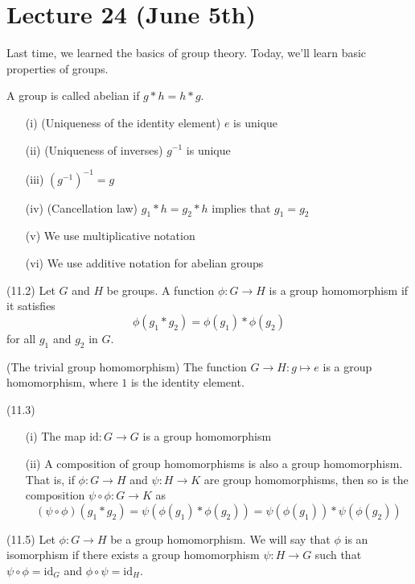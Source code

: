 \section{Lecture 24 (June 5th)}
Last time, we learned the basics of group theory. Today, we'll learn basic properties of groups.
\newline
\begin{rmk}
A group is called abelian if $g*h=h*g$. 
\begin{itemize}
\item[(i)] (Uniqueness of the identity element) $e$ is unique
\item[(ii)] (Uniqueness of inverses) $g^{-1}$ is unique
\item[(iii)] $(g^{-1})^{-1}=g$
\item[(iv)] (Cancellation law) $g_1*h=g_2*h$ implies that $g_1=g_2$
\item[(v)] We use multiplicative notation
\item[(vi)] We use additive notation for abelian groups
\end{itemize}
\end{rmk}
\vspace{2ex}
\begin{defi}
(11.2) Let $G$ and $H$ be groups. A function $\phi :G\rightarrow H$ is a group homomorphism if it satisfies
\[\phi (g_1*g_2)=\phi (g_1)*\phi (g_2)\]
for all $g_1$ and $g_2$ in $G$. 
\end{defi}
\vspace{2ex}
\begin{ex}
(The trivial group homomorphism) The function $G\rightarrow H:g\mapsto e$ is a group homomorphism, where $1$ is the identity element.
\end{ex}
\vspace{2ex}
\begin{prop}
(11.3)
\begin{itemize}
\item[(i)] The map $\mathrm{id}:G\rightarrow G$ is a group homomorphism
\item[(ii)] A composition of group homomorphisms is also a group homomorphism. That is, if $\phi :G\rightarrow H$ and $\psi :H\rightarrow K$ are group homomorphisms, then so is the composition $\psi \circ \phi :G\rightarrow K$ as
\[(\psi \circ\phi )(g_1*g_2)=\psi (\phi(g_1)*\phi (g_2))=\psi (\phi (g_1))*\psi (\phi (g_2))\]
\end{itemize}
\end{prop}
\vspace{2ex}
\begin{defi}
(11.5) Let $\phi :G\rightarrow H$ be a group homomorphism. We will say that $\phi $ is an isomorphism if there exists a group homomorphism $\psi :H\rightarrow G$ such that $\psi \circ\phi =\mathrm{id}_{G}$ and $\phi \circ\psi =\mathrm{id}_{H}$. 
\end{defi}
